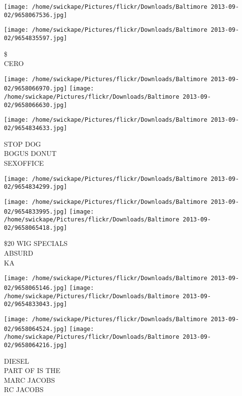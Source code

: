 \documentclass[10pt,letterpaper]{article}
\begin{document}
\texttt{[image: /home/swickape/Pictures/flickr/Downloads/Baltimore 2013-09-02/9658067536.jpg]}

\vspace{0.25in}
\texttt{[image: /home/swickape/Pictures/flickr/Downloads/Baltimore 2013-09-02/9654835597.jpg]}

\$\\
CERO\\
\pagebreak

\texttt{[image: /home/swickape/Pictures/flickr/Downloads/Baltimore 2013-09-02/9658066970.jpg]}
\texttt{[image: /home/swickape/Pictures/flickr/Downloads/Baltimore 2013-09-02/9658066630.jpg]}

\texttt{[image: /home/swickape/Pictures/flickr/Downloads/Baltimore 2013-09-02/9654834633.jpg]}

STOP DOG\\
BOGUS DONUT\\
SEXOFFICE\\
\pagebreak

\texttt{[image: /home/swickape/Pictures/flickr/Downloads/Baltimore 2013-09-02/9654834299.jpg]}

\vspace{0.25in}
\texttt{[image: /home/swickape/Pictures/flickr/Downloads/Baltimore 2013-09-02/9654833995.jpg]}
\texttt{[image: /home/swickape/Pictures/flickr/Downloads/Baltimore 2013-09-02/9658065418.jpg]}

\$20 WIG SPECIALS\\
ABSURD\\
KA\\
\pagebreak

\texttt{[image: /home/swickape/Pictures/flickr/Downloads/Baltimore 2013-09-02/9658065146.jpg]}
\texttt{[image: /home/swickape/Pictures/flickr/Downloads/Baltimore 2013-09-02/9654833043.jpg]}

\texttt{[image: /home/swickape/Pictures/flickr/Downloads/Baltimore 2013-09-02/9658064524.jpg]}
\texttt{[image: /home/swickape/Pictures/flickr/Downloads/Baltimore 2013-09-02/9658064216.jpg]}

DIESEL\\
PART OF IS THE\\
MARC JACOBS\\
RC JACOBS\\
\pagebreak
\end{document}
